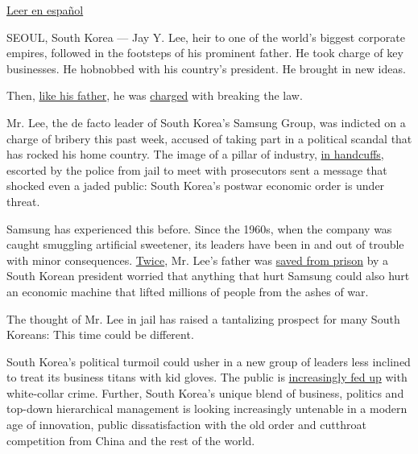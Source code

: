 \href{https://www.nytimes3xbfgragh.onion/es/2017/03/09/el-escandalo-de-samsung-amenaza-la-narrativa-de-exito-de-corea-del-sur/}{Leer
en español}

SEOUL, South Korea --- Jay Y. Lee, heir to one of the world's biggest
corporate empires, followed in the footsteps of his prominent father. He
took charge of key businesses. He hobnobbed with his country's
president. He brought in new ideas.

Then,
\href{http://www.nytimes3xbfgragh.onion/2008/04/17/business/worldbusiness/17iht-samsung.4.12107507.html}{like
his father}, he was
\href{https://www.nytimes3xbfgragh.onion/2017/02/28/world/asia/lee-jae-yong-samsung.html}{charged}
with breaking the law.

Mr. Lee, the de facto leader of South Korea's Samsung Group, was
indicted on a charge of bribery this past week, accused of taking part
in a political scandal that has rocked his home country. The image of a
pillar of industry,
\href{https://www.yahoo.com/news/arrested-samsung-heir-appears-handcuffed-questioning-083230348.html}{in
handcuffs}, escorted by the police from jail to meet with prosecutors
sent a message that shocked even a jaded public: South Korea's postwar
economic order is under threat.

Samsung has experienced this before. Since the 1960s, when the company
was caught smuggling artificial sweetener, its leaders have been in and
out of trouble with minor consequences.
\href{http://www.nytimes3xbfgragh.onion/1996/08/27/world/death-sentence-for-ex-president-chun-a-landmark-for-korea.html}{Twice},
Mr. Lee's father was
\href{http://www.nytimes3xbfgragh.onion/2009/12/30/business/global/30samsung.html}{saved
from prison} by a South Korean president worried that anything that hurt
Samsung could also hurt an economic machine that lifted millions of
people from the ashes of war.

The thought of Mr. Lee in jail has raised a tantalizing prospect for
many South Koreans: This time could be different.

South Korea's political turmoil could usher in a new group of leaders
less inclined to treat its business titans with kid gloves. The public
is
\href{https://www.nytimes3xbfgragh.onion/2016/07/05/business/dealbook/south-korea-targets-executives-pressed-by-an-angry-public.html}{increasingly
fed up} with white-collar crime. Further, South Korea's unique blend of
business, politics and top-down hierarchical management is looking
increasingly untenable in a modern age of innovation, public
dissatisfaction with the old order and cutthroat competition from China
and the rest of the world.

